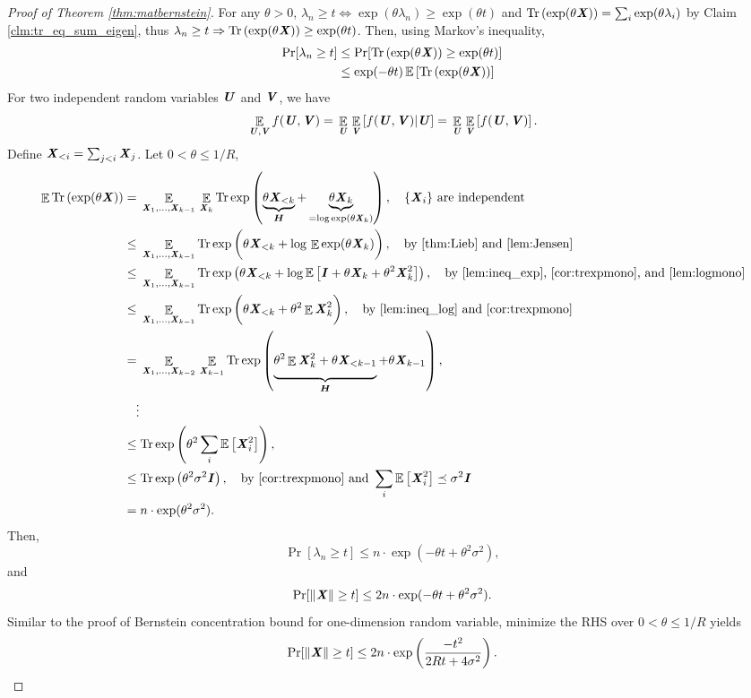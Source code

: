 \begin{proof}[Proof of Theorem \ref{thm:matbernstein}]
  For any $\theta>0$, $\lambda_n\geq t \iff \exp(\theta\lambda_n) \geq \exp(\theta t)$ and
  $\trace{\exp(\theta\XX)} = \sum_i \exp(\theta\lambda_i)$
  by Claim \ref{clm:tr_eq_sum_eigen}, thus $\lambda_n\geq t \Rightarrow \trace{\exp(\theta\XX)}\geq\exp(\theta t)$.
  Then, using Markov's inequality,
  \begin{align*}
    \Pr[\lambda_n\geq t]
    &\leq \Pr[\trace{\exp(\theta\XX)}\geq\exp(\theta t)] \\
    &\leq \exp(-\theta t) \E{\trace{\exp(\theta\XX)}}
  \end{align*}
  For two independent random variables $\UU$ and $\VV$, we have
  \[ \Ex{\UU,\VV} f(\UU,\VV) = \Ex{\UU}\expct{\VV}{f(\UU,\VV)|\UU} = \Ex{\UU}\expct{\VV}{f(\UU,\VV)} . \]
  Define $\XX_{<i} = \sum_{j<i} \XX_j$. Let $0<\theta\leq1/R$,
  \begin{align*}
    \Ex{}\trace{\exp(\theta\XX)}
    &= \Ex{\XX_1,...,\XX_{k-1}} \Ex{\XX_k} \tr\exp\left( \underbrace{\theta\XX_{<k}}_{\HH} + \underbrace{\theta\XX_k}_{=\log\exp(\theta\XX_k)} \right), \quad\{\XX_i\}\text{ are independent}   \\
    &\leq \Ex{\XX_1,...,\XX_{k-1}} \tr\exp\left( \theta\XX_{<k} +
      \log\Ex{}\exp(\theta\XX_k) \right), \quad\text{by \ref{thm:Lieb}
      and \ref{lem:Jensen}} \\
    &\leq \Ex{\XX_1,...,\XX_{k-1}} \tr\exp\left( \theta\XX_{<k} +
      \log\E{\II+\theta\XX_k+\theta^2\XX_k^2} \right), \quad\text{by
      \ref{lem:ineq_exp}, \ref{cor:trexpmono}, and \ref{lem:logmono}} \\
    &\leq \Ex{\XX_1,...,\XX_{k-1}} \tr\exp\left( \theta\XX_{<k} + \theta^2\Ex{}\XX_k^2 \right), \quad\text{by \ref{lem:ineq_log} and \ref{cor:trexpmono}} \\
    &= \Ex{\XX_1,...,\XX_{k-2}} \Ex{\XX_{k-1}} \tr\exp\left( \underbrace{\theta^2\Ex{}\XX_k^2+\theta\XX_{<k-1}}_{\HH} + \theta\XX_{k-1} \right),  \\
    &\quad\vdots \\
    &\leq \tr\exp\left( \theta^2 \sum_i \E{\XX_i^2} \right),\\
    &\leq \tr\exp\left( \theta^2 \sigma^2 \II \right), \quad\text{by \ref{cor:trexpmono} and } \sum_i \E{\XX_i^2}\preceq\sigma^2\II \\
    &= n\cdot\exp(\theta^2\sigma^2).
  \end{align*}
  Then, \[ \Pr[\lambda_n\geq t] \leq n\cdot\exp(-\theta t+\theta^2\sigma^2), \]
  and
  \[ \Pr[\|\XX\|\geq t] \leq 2n\cdot\exp(-\theta t+\theta^2\sigma^2). \]
  Similar to the proof of Bernstein concentration bound for one-dimension random variable, minimize the RHS over $0<\theta\leq1/R$ yields
  \[ \Pr[\|\XX\|\geq t] \leq 2n\cdot\exp\left(\frac{-t^2}{2Rt + 4\sigma^2}\right). \]
\end{proof}


